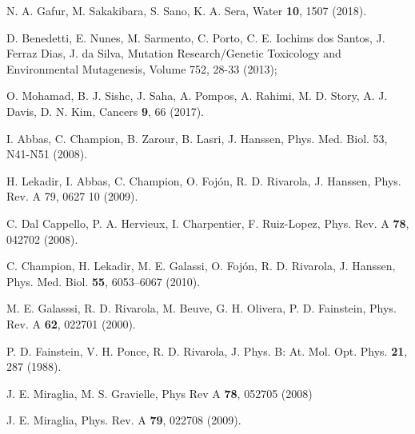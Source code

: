 \begin{thebibliography}{9}
N. A. Gafur, M.  Sakakibara, S. Sano, K. A. Sera, 
Water \textbf{10}, 1507 (2018).

D. Benedetti, E. Nunes, M. Sarmento, C. Porto, C. E. Iochims dos Santos, 
J. Ferraz Dias, J. da Silva,
Mutation Research/Genetic Toxicology and Environmental Mutagenesis,
Volume 752, 28-33 (2013);

O. Mohamad, B. J. Sishc, J. Saha, A. Pompos, A. Rahimi, M. D. Story, 
A. J. Davis, D. N. Kim, 
Cancers \textbf{9}, 66 (2017).


I. Abbas, C. Champion, B. Zarour, B. Lasri, J. Hanssen,
Phys. Med. Biol. 53, N41-N51 (2008).

H. Lekadir, I. Abbas, C. Champion, O. Fojón, R. D. Rivarola, J. Hanssen,
Phys. Rev. A 79, 0627 10 (2009).

C. Dal Cappello, P. A. Hervieux, I. Charpentier, F. Ruiz-Lopez,
Phys. Rev. A \textbf{78}, 042702 (2008).

C. Champion, H. Lekadir, M. E. Galassi, O. Fojón, R. D. Rivarola, 
J. Hanssen,
Phys. Med. Biol. \textbf{55}, 6053--6067 (2010).

M. E. Galasssi, R. D. Rivarola, M. Beuve, G. H. Olivera, P. D. Fainstein, 
Phys. Rev. A \textbf{62}, 022701 (2000).

P. D. Fainstein, V. H. Ponce, R. D. Rivarola,
J. Phys. B: At. Mol. Opt. Phys. \textbf{21}, 287 (1988).

J. E. Miraglia, M. S. Gravielle,
Phys Rev A \textbf{78}, 052705 (2008)

J. E. Miraglia, 
Phys. Rev. A \textbf{79}, 022708 (2009).


\end{thebibliography}
